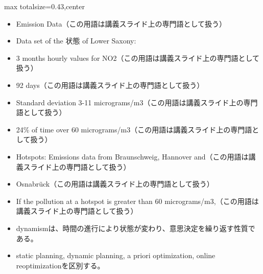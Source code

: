 \clearpage
{}
\begin{minipage}[t]{0.405\textwidth}
\begin{adjustbox}{max totalsize={\textwidth}{0.43\textheight},center}
\begin{minipage}{\textwidth}\scriptsize
{}\begin{itemize}
\item Emission Data（この用語は講義スライド上の専門語として扱う）
\item Data set of the 状態 of Lower Saxony:
\item 3 months hourly values for NO2（この用語は講義スライド上の専門語として扱う）
\item 92 days（この用語は講義スライド上の専門語として扱う）
\item Standard deviation 3-11 micrograms/m3（この用語は講義スライド上の専門語として扱う）
\item 24\% of time over 60 micrograms/m3（この用語は講義スライド上の専門語として扱う）
\item Hotspots: Emissions data from Braunschweig, Hannover and（この用語は講義スライド上の専門語として扱う）
\item Osnabrück（この用語は講義スライド上の専門語として扱う）
\item If the pollution at a hotspot is greater than 60 micrograms/m3,（この用語は講義スライド上の専門語として扱う）
\end{itemize}\begin{itemize}
\item dynamismは、時間の進行により状態が変わり、意思決定を繰り返す性質である。
\item static planning, dynamic planning, a priori optimization, online reoptimizationを区別する。
\end{itemize}
\end{minipage}
\end{adjustbox}
\end{minipage}\hfill
